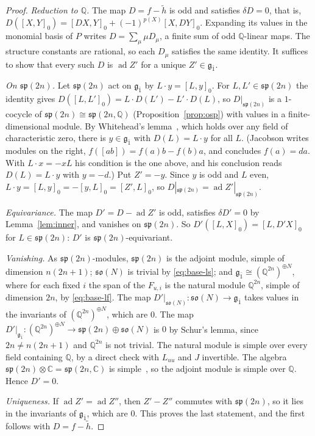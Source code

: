 \documentclass[11pt]{article}
\numberwithin{equation}{section}
\theoremstyle{definition}
\theoremstyle{remark}
\newcommand{\ad}{\operatorname{ad}}
\begin{document}
\begin{proof}
\emph{Reduction to $\mathbb Q$.} The map $D=f-\tilde h$ is odd and satisfies $\delta D=0$, that
is, $D([X,Y]_0)=[DX,Y]_0+(-1)^{p(X)}[X,DY]_0$. Expanding its values in the monomial
basis of $P$ writes $D=\sum_\mu\mu D_\mu$, a finite sum of odd $\mathbb Q$-linear maps.
The structure constants are rational, so each $D_\mu$ satisfies the same identity. It
suffices to show that every such $D$ is $\ad Z'$ for a unique $Z'\in\mathfrak g_{\bar1}$.

\emph{On $\mathfrak{sp}(2n)$.} Let $\mathfrak{sp}(2n)$ act on $\mathfrak g_{\bar1}$ by
$L\cdot y=[L,y]_0$. For $L,L'\in\mathfrak{sp}(2n)$ the identity gives
$D([L,L']_0)=L\cdot D(L')-L'\cdot D(L)$, so $D|_{\mathfrak{sp}(2n)}$ is a $1$-cocycle of
$\mathfrak{sp}(2n)\cong\mathfrak{sp}(2n,\mathbb Q)$ (Proposition~\ref{prop:osp}) with values in a finite-dimensional module.
By Whitehead's lemma~\cite[Chapter~III, \S7, Lemma~3]{Jac}, which holds over any field of
characteristic zero, there is $y\in\mathfrak g_{\bar1}$ with $D(L)=L\cdot y$ for all
$L$. (Jacobson writes modules on the right, $f([ab])=f(a)b-f(b)a$, and concludes
$f(a)=da$. With $L\cdot x=-xL$ his condition is the one above, and his conclusion reads
$D(L)=L\cdot y$ with $y=-d$.) Put $Z'=-y$. Since $y$ is odd and $L$ even,
$L\cdot y=[L,y]_0=-[y,L]_0=[Z',L]_0$, so $D|_{\mathfrak{sp}(2n)}=\ad Z'|_{\mathfrak{sp}(2n)}$.

\emph{Equivariance.} The map $D'=D-\ad Z'$ is odd, satisfies $\delta D'=0$ by
Lemma~\ref{lem:inner}, and vanishes on $\mathfrak{sp}(2n)$. So
$D'([L,X]_0)=[L,D'X]_0$ for $L\in\mathfrak{sp}(2n)$: $D'$ is $\mathfrak{sp}(2n)$-equivariant.

\emph{Vanishing.} As $\mathfrak{sp}(2n)$-modules, $\mathfrak{sp}(2n)$ is the adjoint module, simple of
dimension $n(2n+1)$; $\mathfrak{so}(N)$ is trivial by \eqref{eq:base-ls}; and
$\mathfrak g_{\bar1}\cong(\mathbb Q^{2n})^{\oplus N}$, where for each fixed $i$ the span of the
$F_{u,i}$ is the natural module $\mathbb Q^{2n}$, simple of dimension $2n$, by
\eqref{eq:base-lf}. The map $D'|_{\mathfrak{so}(N)}\colon\mathfrak{so}(N)\to\mathfrak g_{\bar1}$ takes values in the
invariants of $(\mathbb Q^{2n})^{\oplus N}$, which are $0$. The map
$D'|_{\mathfrak g_{\bar1}}\colon(\mathbb Q^{2n})^{\oplus N}\to\mathfrak{sp}(2n)\oplus\mathfrak{so}(N)$ is $0$ by
Schur's lemma, since $2n\neq n(2n+1)$ and $\mathbb Q^{2n}$ is not trivial. The natural module is simple over every field containing $\mathbb Q$, by a direct check with $L_{uu}$
and $J$ invertible. The algebra $\mathfrak{sp}(2n)\otimes\mathbb C=\mathfrak{sp}(2n,\mathbb C)$ is simple~\cite{Jac}, so the
adjoint module is simple over $\mathbb Q$.
Hence $D'=0$.

\emph{Uniqueness.} If $\ad Z'=\ad Z''$, then $Z'-Z''$ commutes with $\mathfrak{sp}(2n)$, so it
lies in the invariants of $\mathfrak g_{\bar1}$, which are $0$. This proves the last statement, and the
first follows with $D=f-\tilde h$.
\end{proof}
\end{document}

